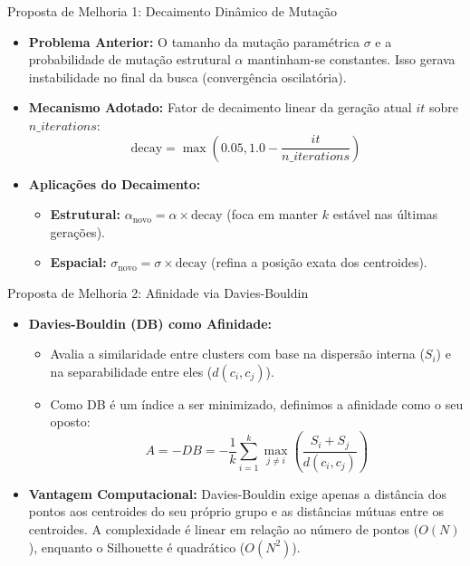 \documentclass[aspectratio=169, 11pt]{beamer}
\begin{document}
\begin{frame}{Proposta de Melhoria 1: Decaimento Dinâmico de Mutação}
  \begin{itemize}
    \item \textbf{Problema Anterior:} O tamanho da mutação paramétrica $\sigma$ e a probabilidade de mutação estrutural $\alpha$ mantinham-se constantes. Isso gerava instabilidade no final da busca (convergência oscilatória).
    \item \textbf{Mecanismo Adotado:} Fator de decaimento linear da geração atual $it$ sobre $n\_iterations$:
      \[ \text{decay} = \max\left(0.05, 1.0 - \frac{it}{n\_iterations}\right) \]
    \item \textbf{Aplicações do Decaimento:}
      \begin{itemize}
        \item \textbf{Estrutural:} $\alpha_{\text{novo}} = \alpha \times \text{decay}$ (foca em manter $k$ estável nas últimas gerações).
        \item \textbf{Espacial:} $\sigma_{\text{novo}} = \sigma \times \text{decay}$ (refina a posição exata dos centroides).
      \end{itemize}
  \end{itemize}
\end{frame}

\begin{frame}{Proposta de Melhoria 2: Afinidade via Davies-Bouldin}
  \begin{itemize}
    \item \textbf{Davies-Bouldin (DB) como Afinidade:}
      \begin{itemize}
        \item Avalia a similaridade entre clusters com base na dispersão interna ($S_i$) e na separabilidade entre eles ($d(c_i, c_j)$).
        \item Como DB é um índice a ser minimizado, definimos a afinidade como o seu oposto:
          \[ A = - DB = - \frac{1}{k} \sum_{i=1}^{k} \max_{j \neq i} \left( \frac{S_i + S_j}{d(c_i, c_j)} \right) \]
      \end{itemize}
    \item \textbf{Vantagem Computacional:} Davies-Bouldin exige apenas a distância dos pontos aos centroides do seu próprio grupo e as distâncias mútuas entre os centroides. A complexidade é linear em relação ao número de pontos ($O(N)$), enquanto o Silhouette é quadrático ($O(N^2)$).
  \end{itemize}
\end{frame}
\end{document}

